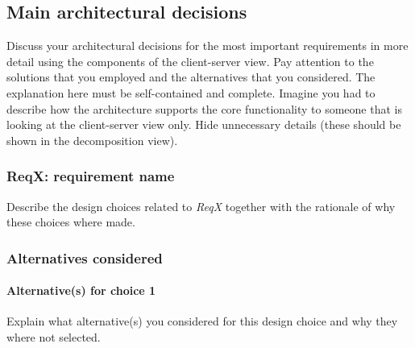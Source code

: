 \subsection{Main architectural decisions}
Discuss your architectural decisions for the most important requirements in
more detail using the components of the client-server view.
Pay attention to the solutions that you employed and the alternatives that you
considered.
The explanation here must be self-contained and complete.
Imagine you had to describe how the architecture supports the core
functionality to someone that is looking at the client-server view only.
Hide unnecessary details (these should be shown in the decomposition view).

\subsubsection{ReqX\@: requirement name}
Describe the design choices related to \emph{ReqX} together with the rationale
of why these choices where made.

\subsubsection*{Alternatives considered}
\paragraph{Alternative(s) for choice 1} Explain what alternative(s) you
considered for this design choice and why they where not selected.
